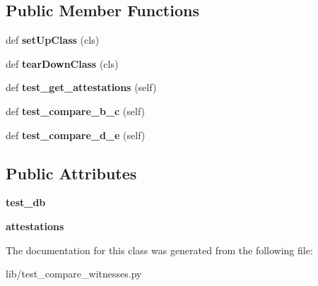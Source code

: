 \subsection*{Public Member Functions}
\begin{DoxyCompactItemize}
\item 
\mbox{\label{classCBGM_1_1lib_1_1test__compare__witnesses_1_1TestAttestations_ad518e816fdd0e420c00cdbbc9d94e6d3}} 
def {\bfseries set\+Up\+Class} (cls)
\item 
\mbox{\label{classCBGM_1_1lib_1_1test__compare__witnesses_1_1TestAttestations_a238f984e41a438393a5f9b02f40f4200}} 
def {\bfseries tear\+Down\+Class} (cls)
\item 
\mbox{\label{classCBGM_1_1lib_1_1test__compare__witnesses_1_1TestAttestations_a3d63670d257197883dafa8708f127841}} 
def {\bfseries test\+\_\+get\+\_\+attestations} (self)
\item 
\mbox{\label{classCBGM_1_1lib_1_1test__compare__witnesses_1_1TestAttestations_a9538860a1f8fa09b217eb029334557f9}} 
def {\bfseries test\+\_\+compare\+\_\+b\+\_\+c} (self)
\item 
\mbox{\label{classCBGM_1_1lib_1_1test__compare__witnesses_1_1TestAttestations_a7562318a40e77c2e835e737413891af9}} 
def {\bfseries test\+\_\+compare\+\_\+d\+\_\+e} (self)
\end{DoxyCompactItemize}
\subsection*{Public Attributes}
\begin{DoxyCompactItemize}
\item 
\mbox{\label{classCBGM_1_1lib_1_1test__compare__witnesses_1_1TestAttestations_af4064021a4ba1bf7b5a102ef497dc9da}} 
{\bfseries test\+\_\+db}
\item 
\mbox{\label{classCBGM_1_1lib_1_1test__compare__witnesses_1_1TestAttestations_a992ff2f94f8f3d679cdffe01b0938e5b}} 
{\bfseries attestations}
\end{DoxyCompactItemize}


The documentation for this class was generated from the following file\+:\begin{DoxyCompactItemize}
\item 
lib/test\+\_\+compare\+\_\+witnesses.\+py\end{DoxyCompactItemize}
